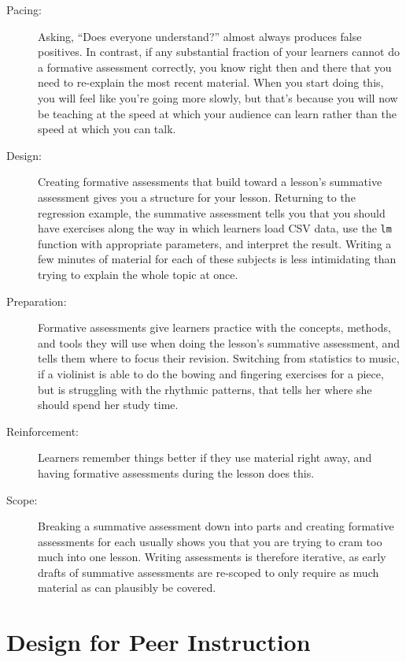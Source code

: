 \documentclass[10pt,letterpaper]{article}
\newcommand{\rulemajor}[1]{\section{#1}}
\begin{document}
\begin{description}

\item[Pacing:] Asking, ``Does everyone understand?''  almost always produces
  false positives.  In contrast, if any substantial fraction of your learners
  cannot do a formative assessment correctly, you know right then and there that
  you need to re-explain the most recent material.  When you start doing this,
  you will feel like you're going more slowly, but that's because you will now
  be teaching at the speed at which your audience can learn rather than the
  speed at which you can talk.

\item[Design:] Creating formative assessments that build toward a lesson's
  summative assessment gives you a structure for your lesson.  Returning to the
  regression example, the summative assessment tells you that you should have
  exercises along the way in which learners load CSV data, use the \texttt{lm}
  function with appropriate parameters, and interpret the result.  Writing a few
  minutes of material for each of these subjects is less intimidating than
  trying to explain the whole topic at once.
  
\item[Preparation:] Formative assessments give learners practice with the
  concepts, methods, and tools they will use when doing the lesson's summative
  assessment, and tells them where to focus their revision.  Switching from
  statistics to music, if a violinist is able to do the bowing and fingering
  exercises for a piece, but is struggling with the rhythmic patterns, that
  tells her where she should spend her study time.
  
\item[Reinforcement:] Learners remember things better if they use material right
  away, and having formative assessments during the lesson does this.

\item[Scope:] Breaking a summative assessment down into parts and creating
  formative assessments for each usually shows you that you are trying to cram
  too much into one lesson.  Writing assessments is therefore iterative, as
  early drafts of summative assessments are re-scoped to only require as much
  material as can plausibly be covered.

\end{description}
  
\rulemajor{Design for Peer Instruction}
\end{document}
